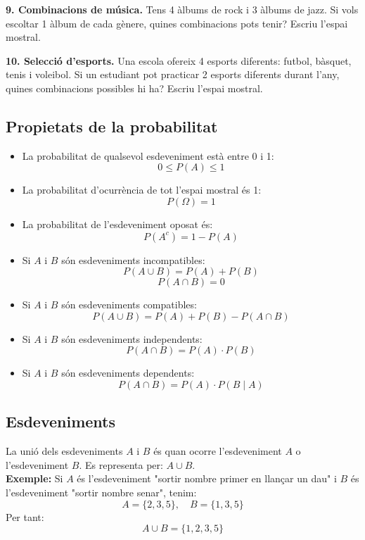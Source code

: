 \documentclass[12pt]{article}
\begin{document}
\begin{exercici} \noindent 
\textbf{9. Combinacions de música.} Tens 4 àlbums de rock i 3 àlbums de jazz. Si vols escoltar 1 àlbum de cada gènere, quines combinacions pots tenir? Escriu l'espai mostral.
\end{exercici}

\begin{exercici} \noindent 
\textbf{10. Selecció d'esports.} Una escola ofereix 4 esports diferents: futbol, bàsquet, tenis i voleibol. Si un estudiant pot practicar 2 esports diferents durant l'any, quines combinacions possibles hi ha? Escriu l'espai mostral.
\end{exercici}

\subsection*{Propietats de la probabilitat}

\begin{concept}[title=Propietats] \noindent
\par
\begin{itemize}
    \item La probabilitat de qualsevol esdeveniment està entre 0 i 1:
    \[
    0 \leq P(A) \leq 1
    \]
    \item La probabilitat d'ocurrència de tot l'espai mostral és 1:
    \[
    P(\Omega) = 1
    \]
    \item La probabilitat de l'esdeveniment oposat és:
    \[
    P(A^c) = 1 - P(A)
    \]
    \item Si $A$ i $B$ són esdeveniments incompatibles:
    \[
    P(A \cup B) = P(A) + P(B)
    \]
    \[
    P(A \cap B) = 0
    \]
    \item Si $A$ i $B$ són esdeveniments compatibles:
    \[
    P(A \cup B) = P(A) + P(B) - P(A \cap B)
    \]
    \item Si $A$ i $B$ són esdeveniments independents:
    \[
    P(A \cap B) = P(A) \cdot P(B)
    \]
    \item Si $A$ i $B$ són esdeveniments dependents:
    \[
    P(A \cap B) = P(A) \cdot P(B \mid A)
    \]
\end{itemize}
\end{concept}


\subsection*{Esdeveniments}

\begin{concept} [title=Unió d'esdeveniments] \noindent La unió dels esdeveniments $A$ i $B$ és quan ocorre l'esdeveniment $A$ o l'esdeveniment $B$. Es representa per: $A \cup B$.  \\

\textbf{Exemple:}  
Si $A$ és l'esdeveniment "sortir nombre primer en llançar un dau" i $B$ és l'esdeveniment "sortir nombre senar", tenim:  
\[
A = \{2, 3, 5\}, \quad B = \{1, 3, 5\}
\]  
Per tant:  
\[
A \cup B = \{1, 2, 3, 5\}
\]
\end{concept}
\end{document}
